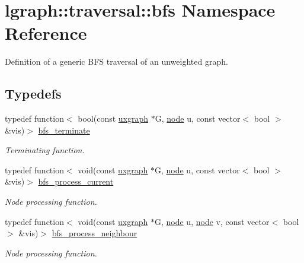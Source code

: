 \hypertarget{namespacelgraph_1_1traversal_1_1bfs}{}\section{lgraph\+:\+:traversal\+:\+:bfs Namespace Reference}
\label{namespacelgraph_1_1traversal_1_1bfs}


Definition of a generic B\+FS traversal of an unweighted graph.  


\subsection*{Typedefs}
\begin{DoxyCompactItemize}
\item 
typedef function$<$ bool(const \hyperlink{classlgraph_1_1utils_1_1uxgraph}{uxgraph} $\ast$G, \hyperlink{namespacelgraph_1_1utils_a7bd66ede3805ef121bc2835bd48de0cf}{node} u, const vector$<$ bool $>$ \&vis)$>$ \hyperlink{namespacelgraph_1_1traversal_1_1bfs_a2622d8419e685b0a28b9ad70ca6c1565}{bfs\+\_\+terminate}
\begin{DoxyCompactList}\small\item\em Terminating function. \end{DoxyCompactList}\item 
typedef function$<$ void(const \hyperlink{classlgraph_1_1utils_1_1uxgraph}{uxgraph} $\ast$G, \hyperlink{namespacelgraph_1_1utils_a7bd66ede3805ef121bc2835bd48de0cf}{node} u, const vector$<$ bool $>$ \&vis)$>$ \hyperlink{namespacelgraph_1_1traversal_1_1bfs_a5a37d7fee20d8b473826d3599ada96b7}{bfs\+\_\+process\+\_\+current}
\begin{DoxyCompactList}\small\item\em Node processing function. \end{DoxyCompactList}\item 
typedef function$<$ void(const \hyperlink{classlgraph_1_1utils_1_1uxgraph}{uxgraph} $\ast$G, \hyperlink{namespacelgraph_1_1utils_a7bd66ede3805ef121bc2835bd48de0cf}{node} u, \hyperlink{namespacelgraph_1_1utils_a7bd66ede3805ef121bc2835bd48de0cf}{node} v, const vector$<$ bool $>$ \&vis)$>$ \hyperlink{namespacelgraph_1_1traversal_1_1bfs_ab8c86ff87736f713c845b61ac6a0a956}{bfs\+\_\+process\+\_\+neighbour}
\begin{DoxyCompactList}\small\item\em Node processing function. \end{DoxyCompactList}\end{DoxyCompactItemize}
